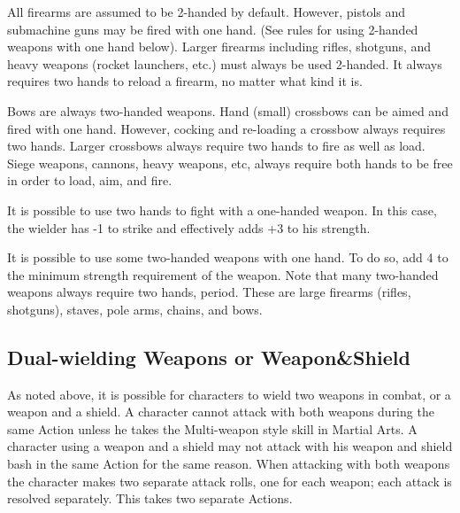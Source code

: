 \documentclass[twoside]{book}
\begin{document}
    {  
    All firearms are assumed to be 2-handed by default. However, pistols and submachine guns may be fired with one hand. (See rules for using 2-handed weapons with one hand below). Larger firearms including rifles, shotguns, and heavy weapons (rocket launchers, etc.) must always be used 2-handed. It always requires two hands to reload a firearm, no matter what kind it is.
    }
  
    {  
    Bows are always two-handed weapons. Hand (small) crossbows can be aimed and fired with one hand. However, cocking and re-loading a crossbow always requires two hands. Larger crossbows always require two hands to fire as well as load. Siege weapons, cannons, heavy weapons, etc, always require both hands to be free in order to load, aim, and fire.
    }
  
    {  
    It is possible to use two hands to fight with a one-handed weapon. In this case, the wielder has -1 to strike and effectively adds +3 to his strength.
    }
  
    {  
    It is possible to use some two-handed weapons with one hand. To do so, add 4 to the minimum strength requirement of the weapon. Note that many two-handed weapons always require two hands, period. These are large firearms (rifles, shotguns), staves, pole arms, chains, and bows.
    }
  
    

\subsection{Dual-wielding Weapons or Weapon\&Shield}
    
    {  
    As noted above, it is possible for characters to wield two weapons in combat, or a weapon and a shield. A character cannot attack with both weapons during the same Action unless he takes the Multi-weapon style skill in Martial Arts. A character using a weapon and a shield may not attack with his weapon and shield bash in the same Action for the same reason. When attacking with both weapons the character makes two separate attack rolls, one for each weapon; each attack is resolved separately. This takes two separate Actions.
    }
  
\end{document}
